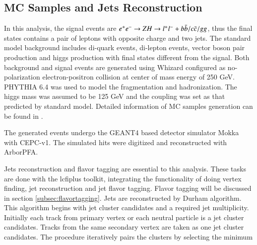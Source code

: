 
\subsection{MC Samples and Jets Reconstruction}
In this analysis, the signal events are $e^+e^-\rightarrow Z H\rightarrow l^{+}l^{-} + b\bar{b}/c\bar{c}/gg$, thus the final states contains a pair of leptons with opposite charge and two jets.  
The standard model background includes di-quark events, di-lepton events, vector boson pair production and higgs production with final states different from the signal. Both background and signal events are generated using Whizard\cite{Wizard_1} configured as no-polarization electron-positron collision at center of mass energy of 250 GeV. PHYTHIA 6.4 \cite{PYTHIA64} was used to model the fragmentation and hadronization. The higgs mass was assumed to be 125 GeV and the coupling was set as that predicted by standard model. Detailed information of MC samples generation can be found in \cite{Samples}.\par
The generated events undergo the GEANT4\cite{Geant4} based detector simulator Mokka\cite{mokka} with CEPC-v1. The simulated hits were digitized and reconstructed with ArborPFA\cite{ArborPFA}. \par
Jets reconstruction and flavor tagging are essential to this analysis.
These tasks are done with the lcfiplus \cite{LCFIPlus} toolkit, integrating the functionality of doing vertex finding, jet reconstruction and jet flavor tagging. 
Flavor tagging will be discussed in section \ref{subsec:flavortagging}. 
Jets are reconstructed by Durham algorithm\cite{Durham}. 
This algorithm begins with jet cluster candidates and a required jet multiplicity. 
Initially each track from primary vertex or each neutral particle is a jet cluster candidates. Tracks from the same secondary vertex are taken as one jet cluster candidates.
The procedure iteratively pairs the clusters by selecting the minimum 
